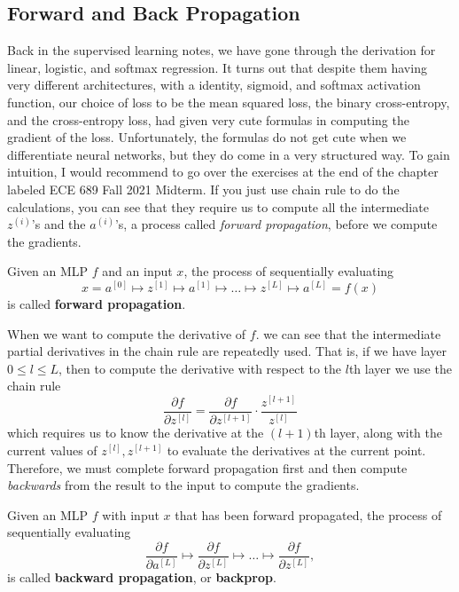 \documentclass{article}
\begin{document}
\subsection{Forward and Back Propagation}

  Back in the supervised learning notes, we have gone through the derivation for linear, logistic, and softmax regression. It turns out that despite them having very different architectures, with a identity, sigmoid, and softmax activation function, our choice of loss to be the mean squared loss, the binary cross-entropy, and the cross-entropy loss, had given very cute formulas in computing the gradient of the loss. Unfortunately, the formulas do not get cute when we differentiate neural networks, but they do come in a very structured way. To gain intuition, I would recommend to go over the exercises at the end of the chapter labeled ECE 689 Fall 2021 Midterm. If you just use chain rule to do the calculations, you can see that they require us to compute all the intermediate $z^{(i)}$'s and the $a^{(i)}$'s, a process called \textit{forward propagation}, before we compute the gradients. 

  \begin{definition}
    Given an MLP $f$ and an input $x$, the process of sequentially evaluating 
    \begin{equation}
      x = a^{[0]} \mapsto z^{[1]} \mapsto a^{[1]} \mapsto \ldots \mapsto z^{[L]} \mapsto a^{[L]} = f(x)
    \end{equation}
    is called \textbf{forward propagation}. 
  \end{definition} 

  When we want to compute the derivative of $f$. we can see that the intermediate partial derivatives in the chain rule are repeatedly used. That is, if we have layer $0 \leq l \leq L$, then to compute the derivative with respect to the $l$th layer we use the chain rule 
  \begin{equation}
    \frac{\partial f}{\partial z^{[l]}} = \frac{\partial f}{\partial z^{[l+1]}} \cdot \frac{z^{[l+1]}}{z^{[l]}}
  \end{equation}
  which requires us to know the derivative at the $(l+1)$th layer, along with the current values of $z^{[l]}, z^{[l+1]}$ to evaluate the derivatives at the current point. Therefore, we must complete forward propagation first and then compute \textit{backwards} from the result to the input to compute the gradients. 

  \begin{definition}
    Given an MLP $f$ with input $x$ that has been forward propagated, the process of sequentially evaluating 
    \begin{equation}
      \frac{\partial f}{\partial a^{[L]}} \mapsto \frac{\partial f}{\partial z^{[L]}} \mapsto \ldots \mapsto \frac{\partial f}{\partial z^{[L]}}, 
    \end{equation}
    is called \textbf{backward propagation}, or \textbf{backprop}. 
  \end{definition}
\end{document}
